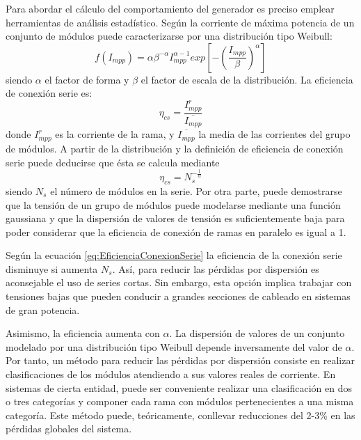 Para abordar el cálculo del comportamiento del generador es preciso
emplear herramientas de análisis estadístico. Según \cite{Zilles1993}
la corriente de máxima potencia de un conjunto de módulos puede caracterizarse
por una distribución tipo Weibull:\begin{equation}
f(I_{mpp})=\alpha\beta^{-\alpha}I_{mpp}^{\alpha-1}exp\left[-\left(\frac{I_{mpp}}{\beta}\right)^{\alpha}\right]\end{equation}
siendo $\alpha$ el factor de forma y $\beta$ el factor de escala
de la distribución. La eficiencia de conexión serie es:\begin{equation}
\eta_{cs}=\frac{I_{mpp}^{r}}{\overline{I_{mpp}}}\end{equation}
donde
$I_{mpp}^{r}$ es la corriente de la rama, y $\overline{I_{mpp}}$
la media de las corrientes del grupo de módulos. A partir de la distribución
y la definición de eficiencia de conexión serie puede deducirse que
ésta se calcula mediante\begin{equation}
\eta_{cs}=N_{s}^{-\frac{1}{\alpha}}\label{eq:EficienciaConexionSerie}\end{equation}
siendo $N_{s}$ el número de módulos en la serie. Por otra parte,
puede demostrarse que la tensión de un grupo de módulos puede modelarse
mediante una función gaussiana y que la dispersión de valores de tensión
es suficientemente baja para poder considerar que la eficiencia de
conexión de ramas en paralelo es igual a 1. 

Según la ecuación \ref{eq:EficienciaConexionSerie} la eficiencia
de la conexión serie disminuye si aumenta $N_{s}$. Así, para reducir
las pérdidas por dispersión es aconsejable el uso de series cortas.
Sin embargo, esta opción implica trabajar con tensiones bajas que
pueden conducir a grandes secciones de cableado en sistemas de gran
potencia. 

Asimismo, la eficiencia aumenta con $\alpha$. La dispersión de valores
de un conjunto modelado por una distribución tipo Weibull depende
inversamente del valor de $\alpha$. Por tanto, un método para reducir
las pérdidas por dispersión consiste en realizar clasificaciones de
los módulos atendiendo a sus valores reales de corriente. En sistemas
de cierta entidad, puede ser conveniente realizar una clasificación
en dos o tres categorías y componer cada rama con módulos pertenecientes
a una misma categoría. Este método puede, teóricamente, conllevar
reducciones del 2-3\% en las pérdidas globales del sistema. 

